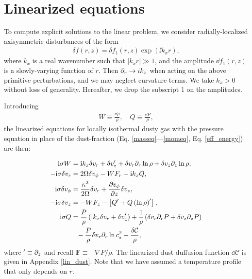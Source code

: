 \section{Linearized equations}\label{linear_problem}
To compute explicit solutions to the linear problem, 
we consider radially-localized axisymmetric disturbances of the form  
\begin{align}
  \delta f (r, z) = \delta f_1(r,z)\exp{(\ii k_x r)},
\end{align} 
where $k_x$ is a real wavenumber such that $|k_xr|\gg 1$, and the 
amplitude $\dd f_1(r,z)$ is 
a slowly-varying function of $r$. Then 
$\partial_r\to i k_x$ when acting on the above primitive perturbations, and we may
neglect curvature terms. We take  
$k_x>0$ without loss of generality. Hereafter, we drop the subscript 1
on the amplitudes. 

Introducing 
\begin{align}
  W \equiv \frac{\dd\rho}{\rho}, \quad Q \equiv \frac{\dd P}{\rho},
\end{align}
the linearized equations for 
locally isothermal dusty gas with the pressure
equation in place of the dust-fraction
(Eq. \ref{masseq}---\ref{momeq}, Eq. \ref{eff_energy}) are then:    

\begin{align}
  \ii\sigma W &= \ii k_x \dd v_r + \dd v_z^\prime +
  \dd v_r \p_r\ln{\rho} + \dd v_z\p_z\ln{\rho},\label{lin_mass}\\
  -\ii\sigma\dd v_r  &= 2\Omega\dd v_\phi 
- W F_r - \ii k_x Q,\label{lin_xmom}\\
  \ii\sigma\dd v_\phi &= \frac{\kappa^2}{2\Omega}\dd v_r + \frac{\p
    v_\phi}{\p z}\dd v_z, \label{lin_ymom}\\
  -\ii\sigma\dd v_z &= - W F_z - \left[Q^\prime + Q
    \left(\ln{\rho}\right)^\prime\right]  %
,\label{lin_zmom}\\
  \ii\sigma Q &= \frac{P}{\rho}\left(\ii k_x \dd v_r + \dd
               v_z^\prime\right) + \frac{1}{\rho}\left(\dd v_r\p_rP + \dd v_z \p_zP\right)\notag\\
                &\phantom{=}-\frac{P}{\rho} \dd v_r\p_r
               \ln{c_s^2} %
               - \frac{\dd\mathcal{C}}{\rho},\label{lin_energy} 
\end{align}  
where $^\prime \equiv \partial_z$ and recall $\bm{F} \equiv -\nabla P/\rho$. 
The linearized dust-duffusion function 
$\dd\mathcal{C}$ is given in  Appendix \ref{lin_dust}. 
Note that we have assumed a temperature profile that only depends on $r$.   

